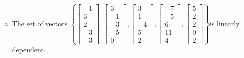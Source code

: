 \begin{exerciseAnswer}
\begin{enumerate}[(a)]
\item  The set of vectors \( \left\{ \left[\begin{array}{c}
-1 \\
3 \\
2 \\
-3 \\
-3
\end{array}\right] , \left[\begin{array}{c}
3 \\
-1 \\
-3 \\
-5 \\
0
\end{array}\right] , \left[\begin{array}{c}
3 \\
1 \\
-4 \\
5 \\
2
\end{array}\right] , \left[\begin{array}{c}
-7 \\
-5 \\
6 \\
11 \\
4
\end{array}\right] , \left[\begin{array}{c}
5 \\
2 \\
2 \\
0 \\
2
\end{array}\right] \right\} \)is linearly dependent.
\end{enumerate}
    
\end{exerciseAnswer}
    
